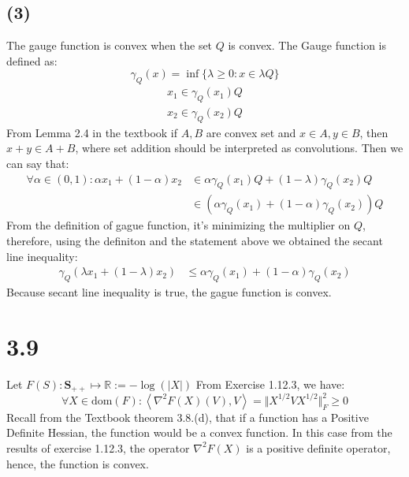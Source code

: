 \documentclass[]{article}
\begin{document}
    \subsection*{(3)}
        The gauge function is convex when the set $Q$ is convex. The Gauge function is defined as: 
        $$
            \gamma_Q(x) = \inf \{\lambda \ge 0 : x \in \lambda Q\}
        $$
        \begin{align*}\tag{3.5.3.1}\label{eqn:3.5.3.1}
            x_1 \in \gamma_Q(x_1)Q
            \\
            x_2 \in \gamma_Q(x_2)Q
        \end{align*}
        From Lemma 2.4 in the textbook if $A, B$ are convex set and $x \in A, y \in B$, then $x + y \in A+ B$, where set addition should be interpreted as convolutions. Then we can say that: 
        \begin{align*}\tag{3.5.3.2}\label{eqn:3.5.3.2}
            \forall \alpha \in (0, 1): 
            \alpha x_1 + (1 - \alpha) x_2 &\in \alpha \gamma_Q(x_1)Q + (1 - \lambda)\gamma_Q(x_2)Q
            \\
            & \in (\alpha \gamma_Q(x_1) + (1 - \alpha)\gamma_Q(x_2))Q
        \end{align*}
        From the definition of gague function, it's minimizing the multiplier on $Q$, therefore, using the definiton and the statement above we obtained the secant line inequality: 
        \begin{align*}\tag{3.5.3.3}\label{eqn:3.5.3.3}
            \gamma_Q(\lambda x_1 + (1 - \lambda)x_2) &\le \alpha \gamma_Q(x_1) + (1 - \alpha) \gamma_Q(x_2)
        \end{align*}
        Because secant line inequality is true, the gague function is convex. 




\section*{3.9}
    Let $F(S): \mathbf{S}_{++} \mapsto \mathbb{R}:= -\log(|X|)$
    From Exercise 1.12.3, we have: 
    $$
        \forall X \in \text{dom}(F) : \left\langle \nabla^2F(X)(V), V \right\rangle = \Vert X^{1/2}VX^{1/2}\Vert_F^2 \ge 0 
    $$
    Recall from the Textbook theorem 3.8.(d), that if a function has a Positive Definite Hessian, the function would be a convex function. In this case from the results of exercise 1.12.3, the operator $\nabla^2F(X)$ is a positive definite operator, hence, the function is convex. 
    
\end{document}
